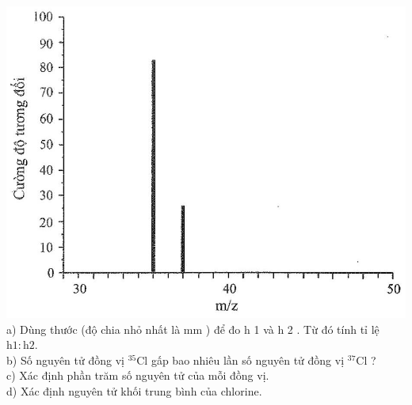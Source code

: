 \documentclass[10pt]{article}
\begin{document}
\includegraphics[max width=\textwidth, center]{2025_10_23_76620c17ffac1ae9b35bg-60}\\
a) Dùng thước (độ chia nhỏ nhất là mm ) để đo h 1 và h 2 . Từ đó tính tỉ lệ $\mathrm{h} 1: \mathrm{h} 2$.\\
b) Số nguyên tử đồng vị ${ }^{35} \mathrm{Cl}$ gấp bao nhiêu lần số nguyên tử đồng vị ${ }^{37} \mathrm{Cl}$ ?\\
c) Xác định phần trăm số nguyên tử của mỗi đồng vị.\\
d) Xác định nguyên tử khối trung bình của chlorine.
\end{document}
